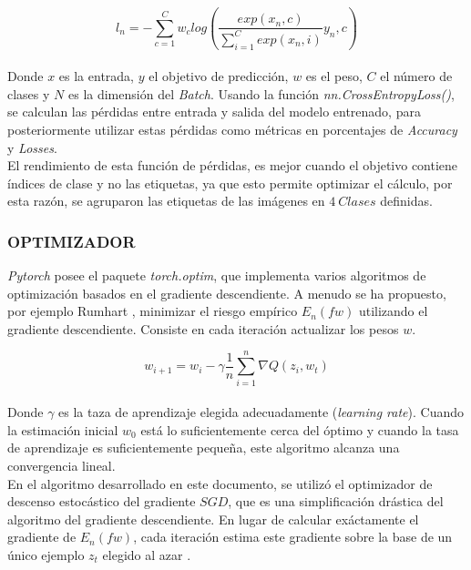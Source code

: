 			\begin{equation}
				{l_n=-\sum_{c=1}^{C}w_c log\left(\frac{exp(x_n,c)}{\sum_{i=1}^{C}exp(x_n,i)}y_n,c\right)}
			\end{equation}\\
			
			Donde $x$ es la entrada, $y$ el objetivo de predicción, $w$ es el peso, $C$ el número de clases y $N$ es la dimensión del \textit{Batch}. Usando la función \textit{nn.CrossEntropyLoss()}, se calculan las pérdidas entre entrada y salida del modelo entrenado, para posteriormente utilizar estas pérdidas como métricas en porcentajes de \textit{Accuracy} y \textit{Losses}.\\			
			
			El rendimiento de esta función de pérdidas, es mejor cuando el objetivo contiene índices de clase y no las etiquetas, ya que esto permite optimizar el cálculo, por esta razón, se agruparon las etiquetas de las imágenes en $4 \ Clases$ definidas.
			
			\subsubsection{OPTIMIZADOR}
			
			\textit{Pytorch} posee el paquete \textit{torch.optim}, que implementa varios algoritmos de optimización basados en el gradiente descendiente. A menudo se ha propuesto, por ejemplo Rumhart \cite{rumelhart1986learning}, minimizar el riesgo empírico $E_n(fw)$ utilizando el gradiente descendiente. Consiste en cada iteración actualizar los pesos $w$.
			
						
			\begin{equation}
				{w_{i+1}=w_i-\gamma\frac{1}{n}\sum_{i=1}^{n}\nabla Q(z_i,w_t)}
				\label{GD}
			\end{equation}\\
			
			Donde $\gamma$ es la taza de aprendizaje elegida adecuadamente (\textit{learning rate}). Cuando la estimación inicial $w_0$ está lo suficientemente cerca del óptimo y cuando la tasa de aprendizaje es suficientemente pequeña, este algoritmo alcanza una convergencia lineal.\\
			
			
			En el algoritmo desarrollado en este documento, se utilizó el optimizador de descenso estocástico del gradiente $SGD$, que es una simplificación drástica del algoritmo del gradiente descendiente. En lugar de calcular exáctamente el gradiente de $E_n(fw)$, cada iteración estima este gradiente sobre la base de un único ejemplo $z_t$ elegido al azar \cite{bottou2012stochastic}.
			
